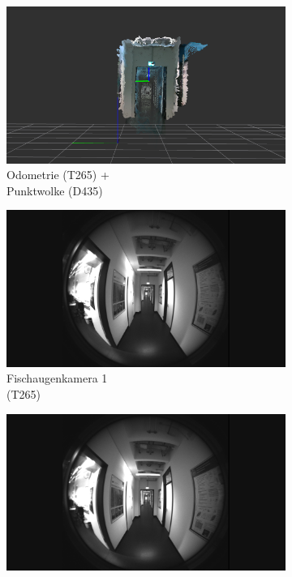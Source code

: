 \begin{figure}[h!]
	\centering
	\begin{subfigure}[b]{0.3\linewidth}
		\centering
		\includegraphics[width=\linewidth]{images/dataset/pointcloud3.png}
		\caption{Odometrie  (T265) + \\ Punktwolke (D435)}
	\end{subfigure}
	\hfill
	\begin{subfigure}[b]{0.3\linewidth}
		\centering
		\includegraphics[width=\linewidth]{images/dataset/f1_frame000005.png}
		\caption{Fischaugenkamera 1 \\ (T265)}
	\end{subfigure}
	\hfill
	\begin{subfigure}[b]{0.3\linewidth}
		\centering
		\includegraphics[width=\linewidth]{images/dataset/f2_frame000005.png}

\end{subfigure}
\end{figure}
